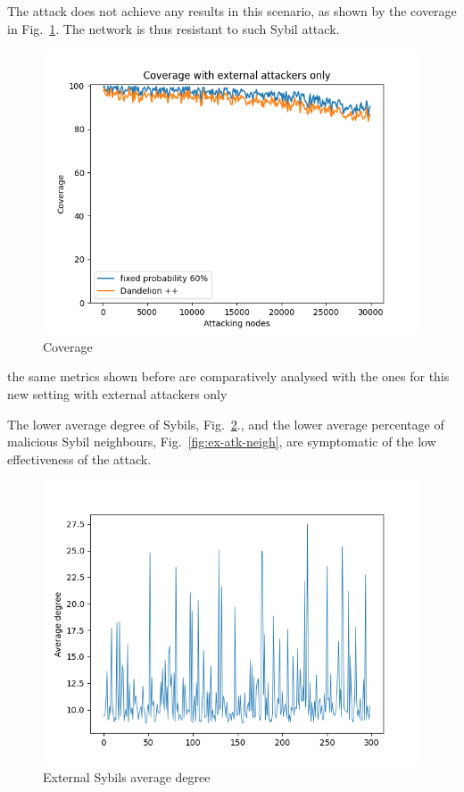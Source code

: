 \documentclass[12pt, letterpaper, twoside]{article}
\begin{document}
The attack does not achieve any results in this scenario, as shown by the coverage in Fig.~\ref{fig:ext-cov}. The network is thus resistant to such Sybil attack.\\

\begin{figure}[h!]
	\includegraphics[width=.7\textwidth]{pict/results/ext-cov.png}
	\centering
	\caption{Coverage}
	\label{fig:ext-cov}
\end{figure}

the same metrics shown before are comparatively analysed with the ones for this new setting with external attackers only

The lower average degree of Sybils, Fig.~\ref{fig:ex-atk-degree}., and the lower average percentage of malicious Sybil neighbours, Fig.~\ref{fig:ex-atk-neigh}, are symptomatic of the low effectiveness of the attack.\\

\begin{figure}[h!]
	\includegraphics[width=.7\textwidth]{pict/results/ex-atk-avg-degree.png}
	\centering
	\caption{External Sybils average degree}
	\label{fig:ex-atk-degree}
\end{figure}
\end{document}
